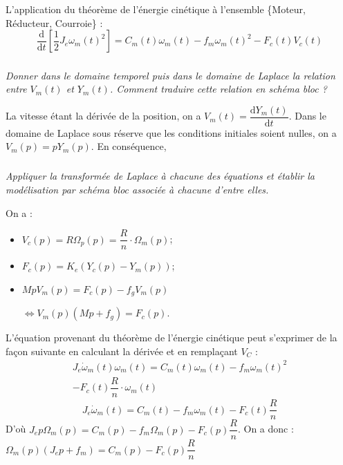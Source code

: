 \documentclass[10pt,fleqn]{article} %
\begin{document}
\begin{multicols}{2}
L'application du théorème de l'énergie cinétique à l'ensemble \{Moteur, Réducteur, Courroie\} :
\begin{equation}
\dfrac{\text{d}}{\text{d}t}\left[ \dfrac{1}{2} J_e \omega_m(t)^2 \right] =  C_m(t) \omega_m(t) - f_m\omega_m(t)^2 - F_c(t) V_c(t) 
\end{equation}

\fi
\subparagraph{} \textit{Donner dans le domaine temporel puis dans le domaine de Laplace la relation entre $V_m(t)$ et $Y_m(t)$. Comment traduire cette relation en schéma bloc ?}
\ifprof
\begin{corrige}
La vitesse étant la dérivée de la position, on a $V_m(t) = \dfrac{\text{d}Y_m(t)}{\text{d}t}$. Dans le domaine de Laplace sous réserve que les conditions initiales soient nulles, on a 
$V_m(p)=pY_m(p)$. En conséquence, 

\begin{center}
\end{center}

\end{corrige}
\else
\fi

\subparagraph{} \textit{Appliquer la transformée de Laplace à chacune des équations et établir la modélisation par schéma bloc associée à chacune d'entre elles.}
\ifprof
\begin{corrige}
On a :
\begin{itemize}
\item [\tiny\color{violet}{ $\blacksquare$}] $V_c(p)=R\Omega_p(p)=\dfrac{R}{n}\cdot \Omega_m(p)$;
\item [\tiny\color{violet}{ $\blacksquare$}] $F_c(p)=K_e\left(Y_c(p) - Y_m(p) \right)$;
\item [\tiny\color{violet}{ $\blacksquare$}] $MpV_m(p) = F_c(p) - f_g V_m(p)$

 $\Longleftrightarrow V_m(p)\left(Mp + f_g \right) = F_c(p) $.
\end{itemize}

L'équation provenant du théorème de l'énergie cinétique peut s'exprimer de la façon suivante en calculant la dérivée et en remplaçant $V_C$ : 
\begin{eqnarray*}J_e \dot{\omega}_m(t) \omega_m(t)= 
C_m(t) \omega_m(t) - f_m\omega_m(t)^2 \\
 - F_c(t) \dfrac{R}{n} \cdot \omega_m(t) 
\end{eqnarray*}
$$
J_e \dot{\omega}_m(t) =  
C_m(t) - f_m\omega_m(t) - F_c(t) \dfrac{R}{n} 
$$
D'où  $J_e p\Omega_m(p) =  
C_m(p) - f_m\Omega_m(p) - F_c(p) \dfrac{R}{n} $. On a donc :
$\Omega_m(p) \left( J_e p + f_m\right) =  
C_m(p)  - F_c(p) \dfrac{R}{n} $ 


\end{corrige}
\end{multicols}
\end{document}

